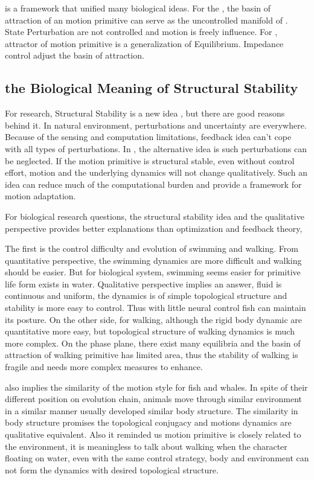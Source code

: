 \moit is a framework that unified many biological ideas.
For the  \umh,  the basin of attraction of an motion primitive can serve as the uncontrolled manifold of \umh.
State Perturbation are not controlled and motion is freely influence.
For \eph, attractor of motion primitive is a generalization of Equilibrium.
Impedance control adjust the basin of attraction.





\subsection{the Biological Meaning of Structural Stability}
For \cms research, Structural Stability is a new idea , but there are good reasons behind it. 
In natural environment, perturbations and uncertainty are everywhere. 
Because of the sensing and computation limitations,  feedback idea  can't cope with all types of perturbations.
In \moit, the alternative idea is such perturbations can be neglected.
If the motion primitive is structural stable, even without control effort, motion and the underlying dynamics will not change qualitatively.
Such an idea can reduce much of the computational burden and provide a framework for motion adaptation.


For biological research questions, the structural stability idea and the qualitative perspective provides better explanations than optimization and feedback theory,

The first is the control difficulty and  evolution of swimming and walking.
From quantitative perspective, the swimming dynamics are more difficult and walking should be easier.
But for biological system, swimming seems easier for primitive life form exists in water.
Qualitative perspective implies an answer, fluid is continuous and uniform, the dynamics is of simple topological structure and stability is more easy to control.
Thus with little neural control fish can maintain its posture. 
On the other side, for walking, although the rigid body dynamic are quantitative more easy, but topological structure of walking dynamics is much more complex. 
On the phase plane, there exist many equilibria and the basin of attraction of walking primitive has limited area,
thus the  stability of walking is fragile and needs more complex measures to enhance.

\moit also implies the similarity of the motion style for fish and whales.
In spite of their different position on evolution chain, animals move through similar environment in a similar manner usually developed similar body structure.
The similarity in body structure promises the topological conjugacy and motions dynamics are qualitative equivalent.
Also it reminded us motion primitive is closely related to the environment, it is meaningless to talk about walking when the character floating on water, even with the same control strategy, body and environment can not form the dynamics with desired topological structure.



